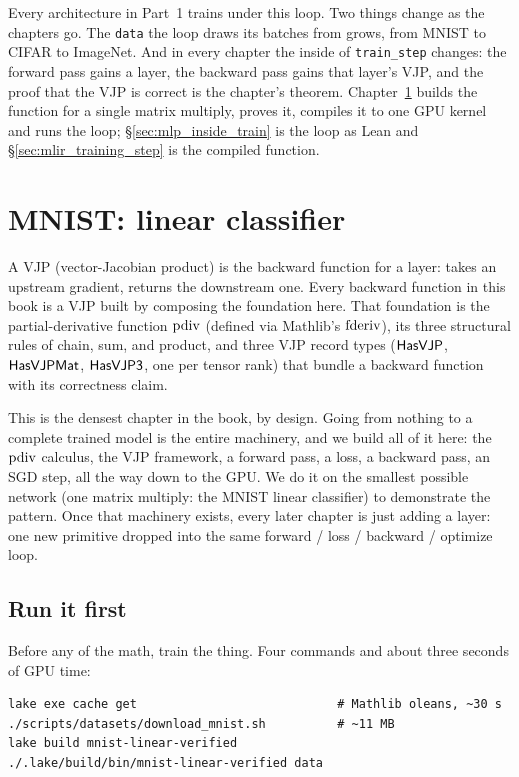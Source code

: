 Every architecture in Part~1 trains under this loop. Two things change
as the chapters go. The \texttt{data} the loop draws its batches from
grows, from MNIST to CIFAR to ImageNet. And in every chapter the inside of
\texttt{train\_step} changes: the forward pass gains a layer, the backward
pass gains that layer's VJP, and the proof that the VJP is correct is the
chapter's theorem.
Chapter~\ref{chap:tensor} builds the function for a single matrix
multiply, proves it, compiles it to one GPU kernel and runs the loop;
\S\ref{sec:mlp_inside_train} is the loop as Lean and
\S\ref{sec:mlir_training_step} is the compiled function.

\chapter{MNIST: linear classifier}
\label{chap:tensor}

A VJP (vector-Jacobian product) is the backward function for a layer:
takes an upstream gradient, returns the downstream one. Every backward
function in this book is a VJP built by composing the foundation here.
That foundation is the partial-derivative function \(\operatorname{pdiv}\) (defined
via Mathlib's \(\operatorname{fderiv}\)), its three structural rules of chain, sum,
and product, and three VJP record types (\(\mathsf{HasVJP}\),
\(\mathsf{HasVJPMat}\), \(\mathsf{HasVJP3}\), one per tensor rank) that bundle a
backward function with its correctness claim.

This is the densest chapter in the book, by design. Going
from nothing to a complete trained model is the entire machinery, and we
build all of it here: the \(\operatorname{pdiv}\) calculus, the VJP framework, a
forward pass, a loss, a backward pass, an SGD step, all the way down to
the GPU. We do it on the smallest possible network (one matrix multiply: the
MNIST linear classifier) to demonstrate the pattern. Once that machinery exists, every later
chapter is just adding a layer: one new primitive dropped into the
same forward / loss / backward / optimize loop.

\section{Run it first}

Before any of the math, train the thing. Four commands and about three
seconds of GPU time:

\begin{verbatim}
lake exe cache get                            # Mathlib oleans, ~30 s
./scripts/datasets/download_mnist.sh          # ~11 MB
lake build mnist-linear-verified
./.lake/build/bin/mnist-linear-verified data
\end{verbatim}

